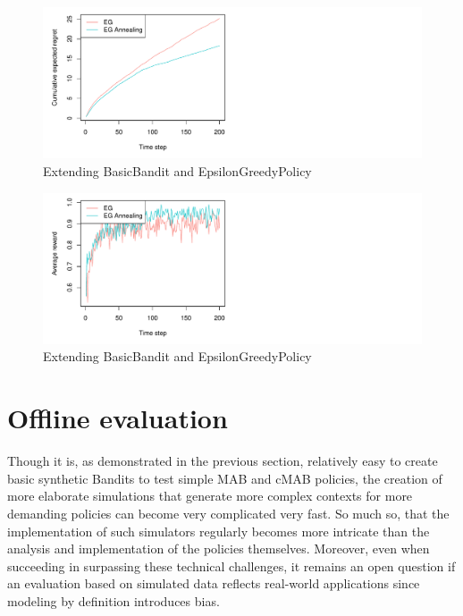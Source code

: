 \documentclass[nojss]{jss}\usepackage[]{graphicx}\usepackage[]{color}
\makeatletter
\def\maxwidth{ %
  \ifdim\Gin@nat@width>\linewidth
    \linewidth
  \else
    \Gin@nat@width
  \fi
}
\newenvironment{knitrout}{}{} %
\makeatother
\begin{document}
\begin{center}
\begin{knitrout}
\color{fgcolor}\begin{figure}[H]
\includegraphics[width=\maxwidth,]{fig/fig4-1} \caption[Extending BasicBandit and EpsilonGreedyPolicy]{Extending BasicBandit and EpsilonGreedyPolicy}\label{fig:fig41}
\end{figure}

\begin{figure}[H]
\includegraphics[width=\maxwidth,]{fig/fig4-2} \caption[Extending BasicBandit and EpsilonGreedyPolicy]{Extending BasicBandit and EpsilonGreedyPolicy}\label{fig:fig42}
\end{figure}


\end{knitrout}
\end{center}

\section{Offline evaluation}

Though it is, as demonstrated in the previous section, relatively easy to create basic synthetic Bandits to test simple MAB and cMAB policies, the creation of more elaborate simulations that generate more complex contexts for more demanding policies can become very complicated very fast. So much so, that the implementation of such simulators regularly becomes more intricate than the analysis and implementation of the policies themselves. Moreover, even when succeeding in surpassing these technical challenges, it remains an open question if an evaluation based on simulated data reflects real-world applications since modeling by definition introduces bias.
\end{document}
